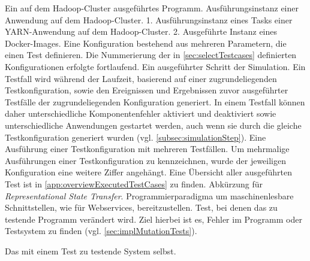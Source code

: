    {Ein auf dem Hadoop-Cluster ausgeführtes Programm.}
    {Ausführungsinstanz einer Anwendung auf dem Hadoop-Cluster.}
    {1. Ausführungsinstanz eines Tasks einer YARN-Anwendung auf dem Hadoop-Cluster.
        2. Ausgeführte Instanz eines Docker-Images.}
    {Eine Konfiguration bestehend aus mehreren Parametern, die einen Test definieren.
        Die Nummerierung der in \cref{sec:selectTestcases} definierten Konfigurationen erfolgte fortlaufend.}
    {Ein ausgeführter Schritt der Simulation.
        Ein Testfall wird während der Laufzeit, basierend auf einer zugrundeliegenden Testkonfiguration, sowie den Ereignissen und Ergebnissen zuvor ausgeführter Testfälle der zugrundeliegenden Konfiguration generiert.
        In einem Testfall können daher unterschiedliche Komponentenfehler aktiviert und deaktiviert sowie unterschiedliche Anwendungen gestartet werden, auch wenn sie durch die gleiche Testkonfiguration generiert wurden (vgl. \cref{subsec:simulationStep}).}
    {Eine Ausführung einer Testkonfiguration mit mehreren Testfällen.
        Um mehrmalige Ausführungen einer Testkonfiguration zu kennzeichnen, wurde der jeweiligen Konfiguration eine weitere Ziffer angehängt.
        Eine Übersicht aller ausgeführten Test ist in \cref{app:overviewExecutedTestCases} zu finden.}
    {Abkürzung für \emph{Representational State Transfer}.
        Programmierparadigma um maschinenlesbare Schnittstellen, wie \zB für Webservices, bereitzustellen.}
    {Test, bei denen das zu testende Programm verändert wird.
        Ziel hierbei ist es, Fehler im Programm oder Testsystem zu finden (vgl. \cref{sec:implMutationTests}).}

    {Das mit einem Test zu testende System selbst.}
